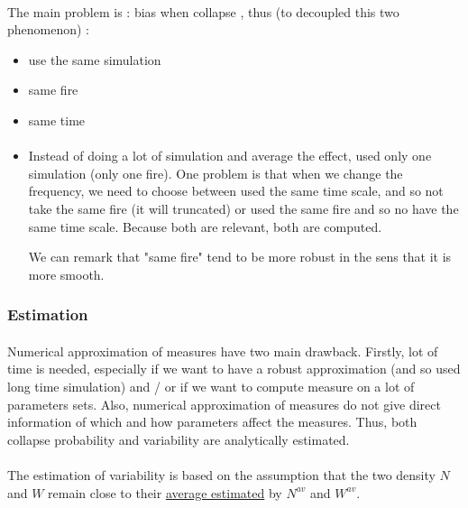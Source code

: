 \documentclass{article}
\begin{document}
\paragraph{}
The main problem is : bias when collapse , thus (to decoupled this two phenomenon) : 
\begin{itemize}
    \item use the same simulation
    \item same fire 
    \item same time
    \item \paragraph{}
        Instead of doing a lot of simulation and average the effect, used only one simulation (only one fire). One problem is that when we change the frequency, we need to choose between used the same time scale, and so not take the same fire (it will truncated) or used the same fire and so no have the same time scale. Because both are relevant, both are computed. 
        
        We can remark that "same fire" tend to be more robust in the sens that it is more smooth.
\end{itemize}


\subsubsection{Estimation}


\paragraph{} %
Numerical approximation of measures have two main drawback. Firstly, lot of time is needed, especially if we want to have a robust approximation (and so used long time simulation) and / or if we want to compute measure on a lot of parameters sets. Also, numerical approximation of measures do not give direct information of which and how parameters affect the measures. 
Thus, both collapse probability and variability are analytically estimated.

\paragraph{} %
The estimation of variability is based on the assumption that the two density $N$ and $W$ remain close to their \hyperref[average_estimation]{average estimated} by $N^{av}$ and $W^{av}$. 
\end{document}
